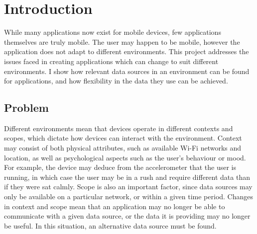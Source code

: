 \documentclass[12pt,twoside,notitlepage]{report}
\begin{document}
\bigskip
{}

\cleardoublepage

\tableofcontents

\listoffigures

\newpage


\cleardoublepage        %

\setcounter{page}{1}
\pagestyle{headings}

\chapter{Introduction}

While many applications now exist for mobile devices, few applications themselves are truly mobile. 
The user may happen to be mobile, however the application does not adapt to different environments. 
This project addresses the issues faced in creating applications which can change to suit different environments. 
I show how relevant data sources in an environment can be found for applications, and how flexibility in the data they use can be achieved. 

\section{Problem}
Different environments mean that devices operate in different contexts and scopes, which dictate how devices can interact with the environment. 
Context may consist of both physical attributes, such as available Wi-Fi networks and location, as well as psychological aspects such as the user's behaviour or mood.
For example, the device may deduce from the accelerometer that the user is running, in which case the user may be in a rush and require different data than if they were sat calmly.
Scope is also an important factor, since data sources may only be available on a particular network, or within a given time period. 
Changes in context and scope mean that an application may no longer be able to communicate with a given data source, or the data it is providing may no longer be useful. 
In this situation, an alternative data source must be found.
\end{document}
